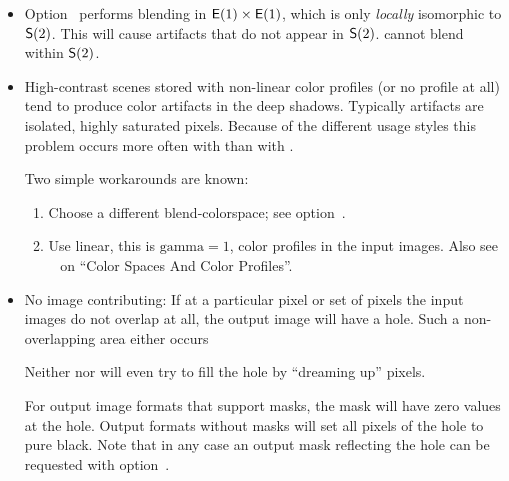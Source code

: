 \begin{itemize}
\item
  Option~ performs blending in $\mathsf{E}(1) \times \mathsf{E}(1)$,
  which is only \emph{locally} isomorphic to $\mathsf{S}(2)$.  This will cause artifacts
  that do not appear in $\mathsf{S}(2)$.  \App{} cannot blend within $\mathsf{S}(2)$.
\fi%

%
%
%
\item
  High-contrast scenes stored with non-linear color profiles (or no profile at all) tend to
  produce color artifacts in the deep shadows.  Typically artifacts are isolated, highly
  saturated pixels.  Because of the different usage styles this problem occurs more often with
   than with .

  Two simple workarounds are known:
  \begin{enumerate}
  \item
    Choose a different blend-colorspace; see
    option~.

  \item
    Use linear, this is $\mathrm{gamma} = 1$, color profiles in the input images.  Also see
    \chapterName~ on ``Color Spaces And Color Profiles''.
  \end{enumerate}

%
%
\item
  No image contributing: If at a particular pixel or set of pixels the input images do not
  overlap at all, the output image will have a hole.  Such a non-overlapping area either occurs


  Neither \App{} nor \OtherApp{} will even try to fill the hole by ``dreaming up'' pixels.

  For output image formats that support masks, the mask will have zero values at the hole.
  Output formats without masks will set all pixels of the hole to pure black.  Note that in any
  case an output mask reflecting the hole can be requested with
  option~.


\end{itemize}

